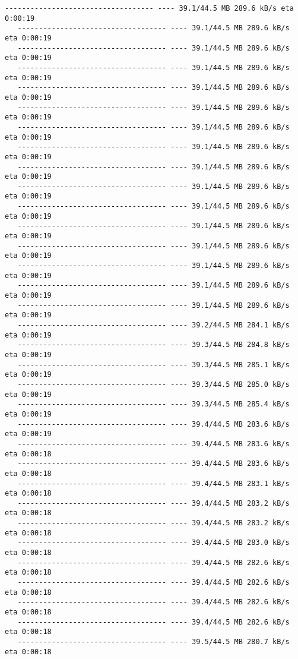 \documentclass[11pt]{article}
\begin{document}
\begin{Verbatim}[commandchars=\\\{\}]
   ----------------------------------- ---- 39.1/44.5 MB 289.6 kB/s eta 0:00:19
   ----------------------------------- ---- 39.1/44.5 MB 289.6 kB/s eta 0:00:19
   ----------------------------------- ---- 39.1/44.5 MB 289.6 kB/s eta 0:00:19
   ----------------------------------- ---- 39.1/44.5 MB 289.6 kB/s eta 0:00:19
   ----------------------------------- ---- 39.1/44.5 MB 289.6 kB/s eta 0:00:19
   ----------------------------------- ---- 39.1/44.5 MB 289.6 kB/s eta 0:00:19
   ----------------------------------- ---- 39.1/44.5 MB 289.6 kB/s eta 0:00:19
   ----------------------------------- ---- 39.1/44.5 MB 289.6 kB/s eta 0:00:19
   ----------------------------------- ---- 39.1/44.5 MB 289.6 kB/s eta 0:00:19
   ----------------------------------- ---- 39.1/44.5 MB 289.6 kB/s eta 0:00:19
   ----------------------------------- ---- 39.1/44.5 MB 289.6 kB/s eta 0:00:19
   ----------------------------------- ---- 39.1/44.5 MB 289.6 kB/s eta 0:00:19
   ----------------------------------- ---- 39.1/44.5 MB 289.6 kB/s eta 0:00:19
   ----------------------------------- ---- 39.1/44.5 MB 289.6 kB/s eta 0:00:19
   ----------------------------------- ---- 39.1/44.5 MB 289.6 kB/s eta 0:00:19
   ----------------------------------- ---- 39.1/44.5 MB 289.6 kB/s eta 0:00:19
   ----------------------------------- ---- 39.2/44.5 MB 284.1 kB/s eta 0:00:19
   ----------------------------------- ---- 39.3/44.5 MB 284.8 kB/s eta 0:00:19
   ----------------------------------- ---- 39.3/44.5 MB 285.1 kB/s eta 0:00:19
   ----------------------------------- ---- 39.3/44.5 MB 285.0 kB/s eta 0:00:19
   ----------------------------------- ---- 39.3/44.5 MB 285.4 kB/s eta 0:00:19
   ----------------------------------- ---- 39.4/44.5 MB 283.6 kB/s eta 0:00:19
   ----------------------------------- ---- 39.4/44.5 MB 283.6 kB/s eta 0:00:18
   ----------------------------------- ---- 39.4/44.5 MB 283.6 kB/s eta 0:00:18
   ----------------------------------- ---- 39.4/44.5 MB 283.1 kB/s eta 0:00:18
   ----------------------------------- ---- 39.4/44.5 MB 283.2 kB/s eta 0:00:18
   ----------------------------------- ---- 39.4/44.5 MB 283.2 kB/s eta 0:00:18
   ----------------------------------- ---- 39.4/44.5 MB 283.0 kB/s eta 0:00:18
   ----------------------------------- ---- 39.4/44.5 MB 282.6 kB/s eta 0:00:18
   ----------------------------------- ---- 39.4/44.5 MB 282.6 kB/s eta 0:00:18
   ----------------------------------- ---- 39.4/44.5 MB 282.6 kB/s eta 0:00:18
   ----------------------------------- ---- 39.4/44.5 MB 282.6 kB/s eta 0:00:18
   ----------------------------------- ---- 39.5/44.5 MB 280.7 kB/s eta 0:00:18

\end{Verbatim}
\end{document}

